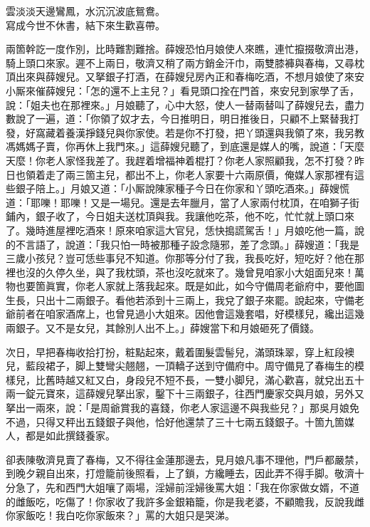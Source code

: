\begin{myquote}
雲淡淡天邊鸞鳳，水沉沉波底鴛鴦。\\寫成今世不休書，結下來生歡喜帶。
\end{myquote}

兩箇幹訖一度作別，比時難割難捨。{}薛嫂恐怕月娘使人來瞧，連忙攛掇敬濟出港，騎上頭口來家。遲不上兩日，敬濟又稍了兩方銷金汗巾，兩雙膝褲與春梅，又尋枕頂出來與薛嫂兒。又拏銀子打酒，在薛嫂兒房內正和春梅吃酒，不想月娘使了來安小厮來催薛嫂兒：「怎的還不上主兒？」看見頭口拴在門首，來安兒到家學了舌，說：「姐夫也在那裡來。」月娘聽了，心中大怒，使人一替兩替叫了薛嫂兒去，盡力數說了一遍，道：「你領了奴才去，今日推明日，明日推後日，只顧不上緊替我打發，好窩藏着養漢掙錢兒與你家使。若是你不打發，把丫頭還與我領了來，我另教馮媽媽子賣，你再休上我門來。」這薛嫂兒聽了，到底還是媒人的嘴，說道：「天麼天麼！你老人家怪我差了。我趕着增福神着棍打？你老人家照顧我，怎不打發？昨日也領着走了兩三箇主兒，都出不上，你老人家要十六兩原價，俺媒人家那裡有這些銀子陪上。」{}月娘又道：「小厮說陳家種子今日在你家和丫頭吃酒來。」薛嫂慌道：「耶嚛！耶嚛！又是一場兒。還是去年臘月，當了人家兩付枕頂，在咱獅子街鋪內，銀子收了，今日姐夫送枕頂與我。我讓他吃茶，他不吃，忙忙就上頭口來了。幾時進屋裡吃酒來！原來咱家這大官兒，恁快搗謊駕舌！」月娘吃他一篇，說的不言語了，說道：「我只怕一時被那種子設念隨邪，差了念頭。」薛嫂道：「我是三歲小孩兒？豈可恁些事兒不知道。你那等分付了我，我長吃好，短吃好？他在那裡也沒的久停久坐，與了我枕頭，茶也沒吃就來了。幾曾見咱家小大姐面兒來！萬物也要箇眞實，你老人家就上落我起來。既是如此，如今守備周老爺府中，要他圖生長，只出十二兩銀子。看他若添到十三兩上，我兌了銀子來罷。說起來，守備老爺前者在咱家酒席上，也曾見過小大姐來。因他會這幾套唱，好模樣兒，纔出這幾兩銀子。又不是女兒，其餘別人出不上。」薛嫂當下和月娘砸死了價錢。

次日，早把春梅收拾打扮，粧點起來，戴着圍髮雲髻兒，滿頭珠翠，穿上紅段襖兒，藍段裙子，脚上雙彎尖翹翹，一頂轎子送到守備府中。周守備見了春梅生的模樣兒，比舊時越又紅又白，身段兒不短不長，一雙小脚兒，滿心歡喜，{}就兌出五十兩一錠元寶來，這薛嫂兒拏出家，鑿下十三兩銀子，往西門慶家交與月娘，另外又拏出一兩來，說：「是周爺賞我的喜錢，你老人家這邊不與我些兒？」那吳月娘免不過，只得又秤出五錢銀子與他，恰好他還禁了三十七兩五錢銀子。十箇九箇媒人，都是如此撰錢養家。

卻表陳敬濟見賣了春梅，又不得往金蓮那邊去，見月娘凡事不理他，門戶都嚴禁，到晚夕親自出來，打燈籠前後照看，上了鎖，方纔睡去，因此弄不得手脚。敬濟十分急了，先和西門大姐嚷了兩場，{}淫婦前淫婦後罵大姐：「我在你家做女婿，不道的雌飯吃，吃傷了！你家收了我許多金銀箱籠，你是我老婆，不顧贍我，反說我雌你家飯吃！我白吃你家飯來？」罵的大姐只是哭涕。

